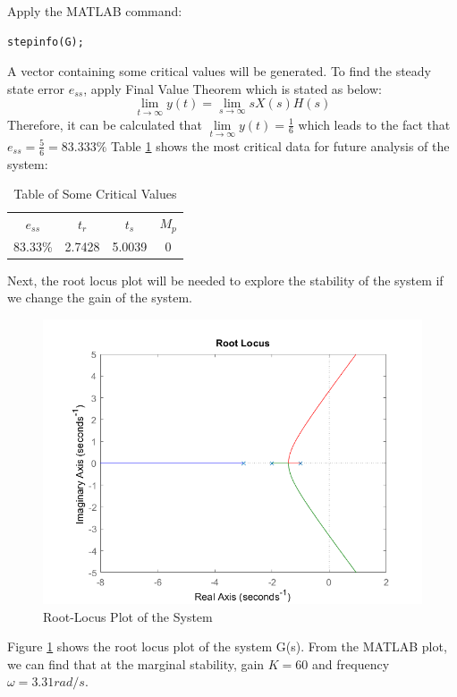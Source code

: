 \documentclass[a4paper, twocolumn, titlepage, 10pt]{article}
\begin{document}
		Apply the MATLAB command:
		\begin{lstlisting}[frame = single, numbers=none]
stepinfo(G);
		\end{lstlisting}
		A vector containing some critical values will be generated. To find the steady state error $e_{ss}$, apply Final Value Theorem which is stated as below:
		\begin{equation}
			\lim\limits_{t \to \infty} y(t) = \lim\limits_{s \to \infty} sX(s)H(s)
			\label{fvt}
		\end{equation}
		Therefore, it can be calculated that $\lim\limits_{t \to \infty} y(t) = \frac{1}{6}$ which leads to the fact that $e_{ss} = \frac{5}{6} = 83.333\%$
		Table \ref{trtsmptable} shows the most critical data for future analysis of the system:
		\begin{table}[H]
			\centering
			\begin{tabular}{c c c c}
				$e_{ss}$ & $t_r$ & $t_s$ & $M_p$ \\
				83.33\% & 2.7428 & 5.0039 & 0
			\end{tabular}
			\caption{Table of Some Critical Values}
			\label{trtsmptable}
		\end{table}
		
		Next, the root locus plot will be needed to explore the stability of the system if we change the gain of the system.
		\begin{figure}[H]
			\centering
			\includegraphics[width=\linewidth]{rlocus}
			\caption{Root-Locus Plot of the System}
			\label{rlocusG}
		\end{figure}
		
		Figure \ref{rlocusG} shows the root locus plot of the system G(s). From the MATLAB plot, we can find that at the marginal stability, gain $K = 60$ and frequency $\omega = 3.31 rad/s$.
		
\end{document}
